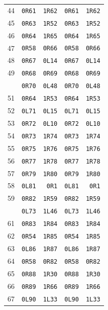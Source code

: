 \begin{longtable}{@{}r r r r r@{}}
44 & \texttt{0R61} & \texttt{1R62} & \texttt{0R61} & \texttt{1R62}\\
45 & \texttt{0R63} & \texttt{1R52} & \texttt{0R63} & \texttt{1R52}\\
46 & \texttt{0R64} & \texttt{1R65} & \texttt{0R64} & \texttt{1R65}\\
47 & \texttt{0R58} & \texttt{0R66} & \texttt{0R58} & \texttt{0R66}\\
48 & \texttt{0R67} & \texttt{0L14} & \texttt{0R67} & \texttt{0L14}\\
49 & \texttt{0R68} & \texttt{0R69} & \texttt{0R68} & \texttt{0R69}\\
\addlinespace[3pt]
50 & \texttt{0R70} & \texttt{0L48} & \texttt{0R70} & \texttt{0L48}\\
51 & \texttt{0R64} & \texttt{1R53} & \texttt{0R64} & \texttt{1R53}\\
52 & \texttt{0L71} & \texttt{0L15} & \texttt{0L71} & \texttt{0L15}\\
53 & \texttt{0R72} & \texttt{0L10} & \texttt{0R72} & \texttt{0L10}\\
54 & \texttt{0R73} & \texttt{1R74} & \texttt{0R73} & \texttt{1R74}\\
55 & \texttt{0R75} & \texttt{1R76} & \texttt{0R75} & \texttt{1R76}\\
56 & \texttt{0R77} & \texttt{1R78} & \texttt{0R77} & \texttt{1R78}\\
57 & \texttt{0R79} & \texttt{1R80} & \texttt{0R79} & \texttt{1R80}\\
58 & \texttt{0L81} & \texttt{0R1} & \texttt{0L81} & \texttt{0R1}\\
59 & \texttt{0R82} & \texttt{1R59} & \texttt{0R82} & \texttt{1R59}\\
\addlinespace[3pt]
60 & \texttt{0L73} & \texttt{1L46} & \texttt{0L73} & \texttt{1L46}\\
61 & \texttt{0R83} & \texttt{1R84} & \texttt{0R83} & \texttt{1R84}\\
62 & \texttt{0R54} & \texttt{1R85} & \texttt{0R54} & \texttt{1R85}\\
63 & \texttt{0L86} & \texttt{1R87} & \texttt{0L86} & \texttt{1R87}\\
64 & \texttt{0R58} & \texttt{0R82} & \texttt{0R58} & \texttt{0R82}\\
65 & \texttt{0R88} & \texttt{1R30} & \texttt{0R88} & \texttt{1R30}\\
66 & \texttt{0R89} & \texttt{1R66} & \texttt{0R89} & \texttt{1R66}\\
67 & \texttt{0L90} & \texttt{1L33} & \texttt{0L90} & \texttt{1L33}\\

\end{longtable}
